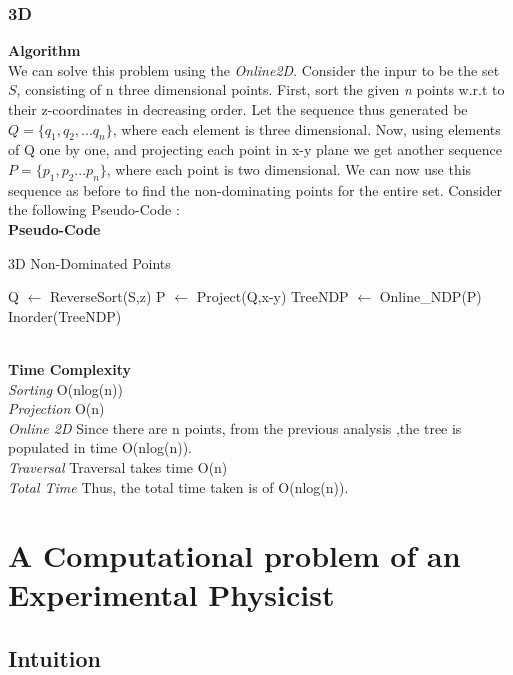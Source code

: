 \documentclass{article}
\begin{document}
\subsubsection{3D}
\textbf{Algorithm}\\
We can solve this problem using the \emph{Online2D}. Consider the inpur to be the set $S$, consisting of n three dimensional points. First, sort the given \emph{n} points w.r.t to their z-coordinates in decreasing order. Let the sequence thus generated be $Q = \{q_1,q_2,... q_n\}$, where each element is three dimensional. Now, using elements of Q one by one, and projecting each point in x-y plane we get another sequence $P= \{p_1,p_2... p_n\}$, where each point is two dimensional. We can now use this sequence as before to find the non-dominating points for the entire set. Consider the following Pseudo-Code :\\
\textbf{Pseudo-Code}
\begin{algorithm}
\caption{3D Non-Dominated Points}
\label{3d}
\begin{algorithmic}[1]
\State Q $\gets$ ReverseSort(S,z)  
\State P $\gets$ Project(Q,x-y)  
\State TreeNDP $\gets$ Online\_NDP(P)   
\State Inorder(TreeNDP)   
\EndProcedure
\end{algorithmic}
\end{algorithm}
\\
\textbf{Time Complexity}\\
\emph{Sorting} O(nlog(n))\\
\emph{Projection} O(n)\\
\emph{Online 2D} Since there are n points, from the previous analysis ,the tree is populated in time O(nlog(n)).\\
\emph{Traversal} Traversal takes time O(n) \\
\emph{Total Time} Thus, the total time taken is of O(nlog(n)).
 

\section{A Computational problem of an Experimental Physicist }

\subsection{Intuition}
\end{document}
